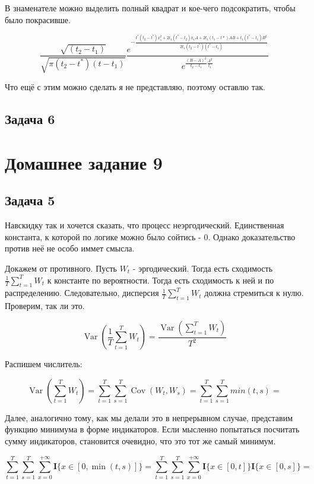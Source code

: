 \documentclass[a4paper,12pt]{article}
\def \mbf{\mathbf}
\def \cov{{\operatorname{Cov}}}
\DeclareMathOperator{\Var}{Var}
\def \I{\mbf{I}}
\begin{document}
В знаменателе можно выделить полный квадрат и кое-чего подсократить, чтобы было покрасивше.

\[ \frac{\sqrt{(t_{2}-t_{1})}}{\sqrt{\pi \left(t_{2}-t^{*}\right)\left(t-t_{1}\right)}} \frac{e^{-\frac{t^{*}\left(t_{2}-t^{*}\right) x_{1}^{2}+2 t_{1}\left(t^{*}-t_{2}\right) x_{1} A + 2 t_{1}\left(t_1-t*\right) A B +t_{1}\left(t^{*}-t_{1}\right) B^{2}}{2 t_{1}\left(t_{2}-t^{*}\right)\left(t^{*}-t_{1}\right)}}}{e^{\frac{(B - A)^2}{t_2 - t_1}\frac{A^2}{t_1}}} \]

Что ещё с этим можно сделать я не представляю, поэтому оставлю так.

\subsection{Задача 6}


\section{Домашнее задание 9}

\subsection{Задача 5}

Навскидку так и хочется сказать, что процесс неэргодический. Единственная константа, к которой по логике можно было сойтись - 0. Однако доказательство против неё не особо иммет смысла. 

Докажем от противного. Пусть $ W_t $ - эргодический. Тогда есть сходимость $ \frac{1}{T}\sum_{t=1}^{T} W_t $ к константе по вероятности. Тогда есть сходимость к ней и по распределению. Следовательно, дисперсия $\frac{1}{T}\sum_{t=1}^{T} W_t $ должна стремиться к нулю. Проверим, так ли это.

\[ \Var(\frac{1}{T}\sum_{t=1}^{T} W_t) = \frac{\Var(\sum_{t=1}^{T} W_t)}{T^2} \]

Распишем числитель:

\[ \Var(\sum_{t=1}^{T} W_t)  = \sum_{t = 1}^{T} \sum_{s = 1}^{T} \cov(W_t, W_s) =  \sum_{t = 1}^{T} \sum_{s = 1}^{T} min(t,s) =  \]

Далее, аналогично тому, как мы делали это в непрерывном случае, представим функцию минимума в форме индикаторов. Если мысленно попытаться посчитать сумму индикаторов, становится очевидно, что это тот же самый минимум.

\[  \sum_{t = 1}^{T} \sum_{s = 1}^{T} \sum_{x=0}^{+\infty} \I\{x\in [0,\min(t,s)]\} = \sum_{t = 1}^{T} \sum_{s = 1}^{T} \sum_{x=0}^{+\infty} \I\{x\in [0, t]\}\I\{x\in [0, s]\} = \]
\end{document}
